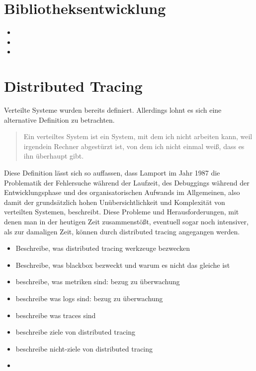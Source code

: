 \section{Bibliotheksentwicklung}
\begin{itemize}
	\item 
	\item 
	\item
\end{itemize}

\section{Distributed Tracing}
Verteilte Systeme wurden bereits definiert. Allerdings lohnt es sich eine alternative Definition zu betrachten.

\begin{quote}
	Ein verteiltes System ist ein System, mit dem ich nicht arbeiten kann, weil irgendein Rechner abgestürzt ist, von dem ich nicht einmal weiß, dass es ihn überhaupt gibt.
\end{quote}


Diese Definition lässt sich so auffassen, dass Lamport im Jahr 1987 die Problematik der Fehlersuche während der Laufzeit, des Debuggings während der Entwicklungsphase und des organisatorischen Aufwands im Allgemeinen, also damit der grundsätzlich hohen Unübersichtlichkeit und Komplexität von verteilten Systemen, beschreibt. Diese Probleme und Herausforderungen, mit denen man in der heutigen Zeit zusammenstößt, eventuell sogar noch intensiver, als zur damaligen Zeit, können durch distributed tracing angegangen werden. 


\begin{itemize}
	\item Beschreibe, was distributed tracing werkzeuge bezwecken
	\item Beschreibe, was blackbox bezweckt und warum es nicht das gleiche ist
	\item beschreibe, was metriken sind: bezug zu überwachung
	\item beschreibe was logs sind: bezug zu überwachung
	\item beschreibe was traces sind
	\item beschreibe ziele von distributed tracing
	\item beschreibe nicht-ziele von distributed tracing
	\item 
\end{itemize}
 
 
